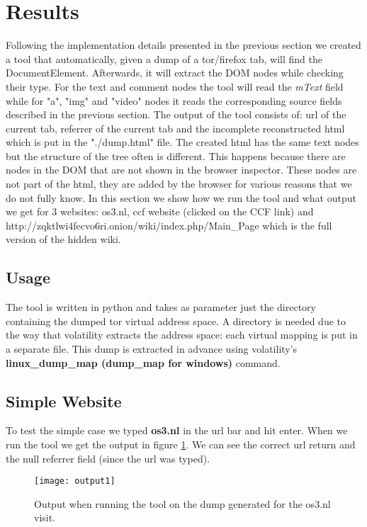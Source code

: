 \section{Results}
\label{sec:results}

Following the implementation details presented in the previous section we created a tool that automatically, given a dump of a tor/firefox tab, will find the DocumentElement. Afterwards, it will extract the DOM nodes while checking their type. For the text and comment nodes the tool will read the \textit{mText} field while for "a", "img" and "video" nodes it reads the corresponding source fields described in the previous section. The output of the tool consists of: url of the current tab, referrer of the current tab and the incomplete reconstructed html which is put in the "./dump.html" file. The created html has the same text nodes but the structure of the tree often is different. This happens because there are nodes in the DOM that are not shown in the browser inspector. These nodes are not part of the html, they are added by the browser for various reasons that we do not fully know. In this section we show how we run the tool and what output we get for 3 websites: os3.nl\cite{os3nl}, ccf website (clicked on the CCF link)\cite{os3ccfnl} and http://zqktlwi4fecvo6ri.onion/wiki/index.php/Main\_Page which is the full version of the hidden wiki\cite{thehiddenwiki}.

\subsection{Usage}
The tool is written in python and takes as parameter just the directory containing the dumped tor virtual address space. A directory is needed due to the way that volatility extracts the address space: each virtual mapping is put in a separate file. This dump is extracted in advance using volatility's \textbf{linux\_dump\_map (dump\_map for windows)} command.

\subsection{Simple Website}
To test the simple case we typed \textbf{os3.nl} in the url bar and hit enter. When we run the tool we get the output in figure \ref{img:output1}. We can see the correct url return and the null referrer field (since the url was typed).

\begin{figure}[h]
	\centering
	\texttt{[image: output1]}
	\caption{Output when running the tool on the dump generated for the os3.nl visit.}
	\label{img:output1}
\end{figure}

